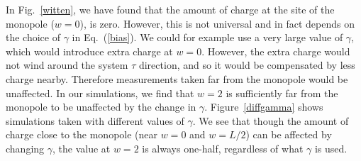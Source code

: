 \documentclass[prb,twocolumn]{revtex4-1}
\newcommand{\scripty}[1]{w}
\begin{document}
In Fig.~\ref{witten}, we have found that the amount of charge at the site of the monopole ($\scripty{r}=0$), is zero. However, this is not universal and in fact depends on the choice of $\gamma$ in Eq.~(\ref{bias}). We could for example use a very large value of $\gamma$, which would introduce extra charge at $\scripty{r}=0$. However, the extra charge would not wind around the system $\tau$ direction, and so it would be compensated by less charge nearby. Therefore measurements taken far from the monopole would be unaffected. In our simulations, we find that $\scripty{r}=2$ is sufficiently far from the monopole to be unaffected by the change in $\gamma$. Figure~\ref{diffgamma} shows simulations taken with different values of $\gamma$. We see that though the amount of charge close to the monopole (near $\scripty{r}=0$ and $\scripty{r}=L/2$) can be affected by changing $\gamma$, the value at $\scripty{r}=2$ is always one-half, regardless of what $\gamma$ is used.
\end{document}
